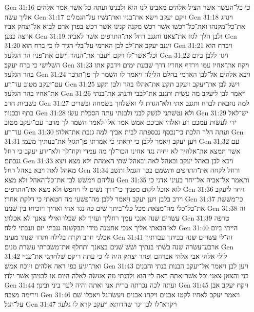 Gen 31:16  כי כל־העשׁר אשׁר הציל אלהים מאבינו לנו הוא ולבנינו ועתה כל אשׁר אמר אלהים אליך עשׂה׃
Gen 31:17  ויקם יעקב וישׂא את־בניו ואת־נשׁיו על־הגמלים׃
Gen 31:18  וינהג את־כל־מקנהו ואת־כל־רכשׁו אשׁר רכשׁ מקנה קנינו אשׁר רכשׁ בפדן ארם לבוא אל־יצחק אביו ארצה כנען׃
Gen 31:19  ולבן הלך לגזז את־צאנו ותגנב רחל את־התרפים אשׁר לאביה׃
Gen 31:20  ויגנב יעקב את־לב לבן הארמי על־בלי הגיד לו כי ברח הוא׃
Gen 31:21  ויברח הוא וכל־אשׁר־לו ויקם ויעבר את־הנהר וישׂם את־פניו הר הגלעד׃
Gen 31:22  ויגד ללבן ביום השׁלישׁי כי ברח יעקב׃
Gen 31:23  ויקח את־אחיו עמו וירדף אחריו דרך שׁבעת ימים וידבק אתו בהר הגלעד׃
Gen 31:24  ויבא אלהים אל־לבן הארמי בחלם הלילה ויאמר לו השׁמר לך פן־תדבר עם־יעקב מטוב עד־רע׃
Gen 31:25  וישׂג לבן את־יעקב ויעקב תקע את־אהלו בהר ולבן תקע את־אחיו בהר הגלעד׃
Gen 31:26  ויאמר לבן ליעקב מה עשׂית ותגנב את־לבבי ותנהג את־בנתי כשׁביות חרב׃
Gen 31:27  למה נחבאת לברח ותגנב אתי ולא־הגדת לי ואשׁלחך בשׂמחה ובשׁרים בתף ובכנור׃
Gen 31:28  ולא נטשׁתני לנשׁק לבני ולבנתי עתה הסכלת עשׂו׃
Gen 31:29  ישׁ־לאל ידי לעשׂות עמכם רע ואלהי אביכם אמשׁ אמר אלי לאמר השׁמר לך מדבר עם־יעקב מטוב עד־רע׃
Gen 31:30  ועתה הלך הלכת כי־נכסף נכספתה לבית אביך למה גנבת את־אלהי׃
Gen 31:31  ויען יעקב ויאמר ללבן כי יראתי כי אמרתי פן־תגזל את־בנותיך מעמי׃
Gen 31:32  עם אשׁר תמצא את־אלהיך לא יחיה נגד אחינו הכר־לך מה עמדי וקח־לך ולא־ידע יעקב כי רחל גנבתם׃
Gen 31:33  ויבא לבן באהל יעקב ובאהל לאה ובאהל שׁתי האמהת ולא מצא ויצא מאהל לאה ויבא באהל רחל׃
Gen 31:34  ורחל לקחה את־התרפים ותשׂמם בכר הגמל ותשׁב עליהם וימשׁשׁ לבן את־כל־האהל ולא מצא׃
Gen 31:35  ותאמר אל־אביה אל־יחר בעיני אדני כי לוא אוכל לקום מפניך כי־דרך נשׁים לי ויחפשׂ ולא מצא את־התרפים׃
Gen 31:36  ויחר ליעקב וירב בלבן ויען יעקב ויאמר ללבן מה־פשׁעי מה חטאתי כי דלקת אחרי׃
Gen 31:37  כי־משׁשׁת את־כל־כלי מה־מצאת מכל כלי־ביתך שׂים כה נגד אחי ואחיך ויוכיחו בין שׁנינו׃
Gen 31:38  זה עשׂרים שׁנה אנכי עמך רחליך ועזיך לא שׁכלו ואילי צאנך לא אכלתי׃
Gen 31:39  טרפה לא־הבאתי אליך אנכי אחטנה מידי תבקשׁנה גנבתי יום וגנבתי לילה׃
Gen 31:40  הייתי ביום אכלני חרב וקרח בלילה ותדד שׁנתי מעיני׃
Gen 31:41  זה־לי עשׂרים שׁנה בביתך עבדתיך ארבע־עשׂרה שׁנה בשׁתי בנתיך ושׁשׁ שׁנים בצאנך ותחלף את־משׂכרתי עשׂרת מנים׃
Gen 31:42  לולי אלהי אבי אלהי אברהם ופחד יצחק היה לי כי עתה ריקם שׁלחתני את־עניי ואת־יגיע כפי ראה אלהים ויוכח אמשׁ׃
Gen 31:43  ויען לבן ויאמר אל־יעקב הבנות בנתי והבנים בני והצאן צאני וכל אשׁר־אתה ראה לי־הוא ולבנתי מה־אעשׂה לאלה היום או לבניהן אשׁר ילדו׃
Gen 31:44  ועתה לכה נכרתה ברית אני ואתה והיה לעד ביני ובינך׃
Gen 31:45  ויקח יעקב אבן וירימה מצבה׃
Gen 31:46  ויאמר יעקב לאחיו לקטו אבנים ויקחו אבנים ויעשׂו־גל ויאכלו שׁם על־הגל׃
Gen 31:47  ויקרא־לו לבן יגר שׂהדותא ויעקב קרא לו גלעד׃
